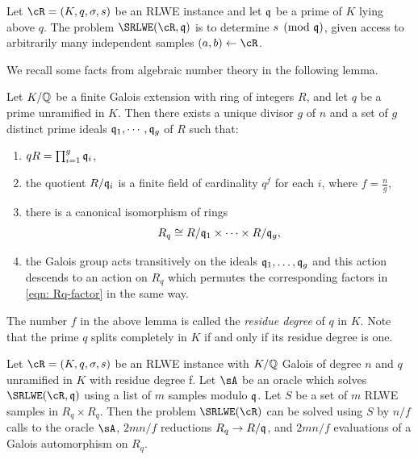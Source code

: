 \documentclass[envcountsame]{llncs}
\begin{document}

\begin{definition} \label{def: srlwe mod q}
        Let $\cR = (K,q,\sigma, s)$ be an RLWE instance and let $\mathfrak{q}$ be a prime of $K$ lying above $q$.  The problem $\SRLWE(\cR, \fq)$ is to determine $s \pmod {\mathfrak{q}}$, given access to arbitrarily many independent samples $(a,b) \gets \cR$.
\end{definition}

We recall some facts from algebraic number theory in the following lemma.
\begin{lemma}
\label{lem: prime factorization}
Let $K/\mathbb{Q}$ be a finite Galois extension with ring of integers $R$,  and let $q$ be a prime unramified in $K$. Then there exists a unique divisor $g$ of $n$ and a set of $g$ distinct prime ideals $\mathfrak{q}_1, \cdots ,\mathfrak{q}_g$ of
$R$ such that:
\begin{enumerate}
        \item $qR = \prod_{i=1}^g \mathfrak{q}_i$,
        \item the quotient $R/\mathfrak{q}_{i}$ is a finite field of cardinality $q^f$  for each $i$, where $f = \frac{n}{g}$,
        \item there is a canonical isomorphism of rings
                \begin{equation}
                        \label{eqn: Rq-factor}
    R_q \cong R/\mathfrak{q}_{1} \times \cdots \times R/\mathfrak{q}_{g},
    \end{equation}
\item the Galois group acts transitively on the ideals $\mathfrak{q}_1, \ldots, \mathfrak{q}_g$ and this action descends to an action on $R_q$ which permutes the corresponding factors in \eqref{eqn: Rq-factor} in the same way.
\end{enumerate}
\end{lemma}
The number $f$ in the above lemma is called the {\it residue degree} of $q$ in $K$. Note that the prime $q$ splits completely in $K$ if and only if its residue degree is one.


\begin{theorem} \label{thm: reduction}
        Let $\cR = (K,q,\sigma, s)$ be an RLWE instance with $K/\mathbb{Q}$ Galois of degree $n$ and $q$ unramified in $K$ with residue degree f. Let $\sA$ be an oracle which solves $\SRLWE(\cR,\fq)$ using a list of $m$ samples modulo $\mathfrak{q}$.  Let $S$ be a set of $m$ RLWE samples in $R_q \times R_q$.  Then the problem $\SRLWE(\cR)$ can be solved using $S$ by $n/f$ calls to the oracle $\sA$, $2mn/f$ reductions $R_q \rightarrow R/\mathfrak{q}$, and $2mn/f$ evaluations of a Galois automorphism on $R_q$.
\end{theorem}
\end{document}
